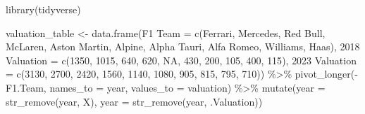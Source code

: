 \documentclass[
]{book}
\newenvironment{Shaded}{\begin{snugshade}}{\end{snugshade}}
\newcommand{\AttributeTok}[1]{\textcolor[rgb]{0.77,0.63,0.00}{#1}}
\newcommand{\ConstantTok}[1]{\textcolor[rgb]{0.00,0.00,0.00}{#1}}
\newcommand{\DecValTok}[1]{\textcolor[rgb]{0.00,0.00,0.81}{#1}}
\newcommand{\FunctionTok}[1]{\textcolor[rgb]{0.00,0.00,0.00}{#1}}
\newcommand{\NormalTok}[1]{#1}
\newcommand{\OtherTok}[1]{\textcolor[rgb]{0.56,0.35,0.01}{#1}}
\newcommand{\SpecialCharTok}[1]{\textcolor[rgb]{0.00,0.00,0.00}{#1}}
\newcommand{\StringTok}[1]{\textcolor[rgb]{0.31,0.60,0.02}{#1}}
\begin{document}
\begin{Shaded}
\begin{Highlighting}[]
\FunctionTok{library}\NormalTok{(tidyverse)}

\NormalTok{valuation\_table }\OtherTok{\textless{}{-}} \FunctionTok{data.frame}\NormalTok{(}\StringTok{\textasciigrave{}}\AttributeTok{F1 Team}\StringTok{\textasciigrave{}} \OtherTok{=} \FunctionTok{c}\NormalTok{(}\StringTok{\textquotesingle{}Ferrari\textquotesingle{}}\NormalTok{, }\StringTok{\textquotesingle{}Mercedes\textquotesingle{}}\NormalTok{, }\StringTok{\textquotesingle{}Red Bull\textquotesingle{}}\NormalTok{, }\StringTok{\textquotesingle{}McLaren\textquotesingle{}}\NormalTok{, }\StringTok{\textquotesingle{}Aston Martin\textquotesingle{}}\NormalTok{,}
                                            \StringTok{\textquotesingle{}Alpine\textquotesingle{}}\NormalTok{, }\StringTok{\textquotesingle{}Alpha Tauri\textquotesingle{}}\NormalTok{, }\StringTok{\textquotesingle{}Alfa Romeo\textquotesingle{}}\NormalTok{, }\StringTok{\textquotesingle{}Williams\textquotesingle{}}\NormalTok{, }\StringTok{\textquotesingle{}Haas\textquotesingle{}}\NormalTok{),}
                              \StringTok{\textasciigrave{}}\AttributeTok{2018 Valuation}\StringTok{\textasciigrave{}} \OtherTok{=} \FunctionTok{c}\NormalTok{(}\DecValTok{1350}\NormalTok{, }\DecValTok{1015}\NormalTok{, }\DecValTok{640}\NormalTok{, }\DecValTok{620}\NormalTok{, }\ConstantTok{NA}\NormalTok{, }\DecValTok{430}\NormalTok{, }\DecValTok{200}\NormalTok{, }\DecValTok{105}\NormalTok{, }\DecValTok{400}\NormalTok{, }\DecValTok{115}\NormalTok{),}
                              \StringTok{\textasciigrave{}}\AttributeTok{2023 Valuation}\StringTok{\textasciigrave{}} \OtherTok{=} \FunctionTok{c}\NormalTok{(}\DecValTok{3130}\NormalTok{, }\DecValTok{2700}\NormalTok{, }\DecValTok{2420}\NormalTok{, }\DecValTok{1560}\NormalTok{, }\DecValTok{1140}\NormalTok{, }\DecValTok{1080}\NormalTok{, }\DecValTok{905}\NormalTok{, }\DecValTok{815}\NormalTok{, }\DecValTok{795}\NormalTok{, }\DecValTok{710}\NormalTok{)) }\SpecialCharTok{\%\textgreater{}\%}
  \FunctionTok{pivot\_longer}\NormalTok{(}\SpecialCharTok{{-}}\NormalTok{ F1.Team, }\AttributeTok{names\_to =} \StringTok{\textquotesingle{}year\textquotesingle{}}\NormalTok{, }\AttributeTok{values\_to =} \StringTok{\textquotesingle{}valuation\textquotesingle{}}\NormalTok{) }\SpecialCharTok{\%\textgreater{}\%}
  \FunctionTok{mutate}\NormalTok{(}\AttributeTok{year =} \FunctionTok{str\_remove}\NormalTok{(year, }\StringTok{\textquotesingle{}X\textquotesingle{}}\NormalTok{),}
         \AttributeTok{year =} \FunctionTok{str\_remove}\NormalTok{(year, }\StringTok{\textquotesingle{}.Valuation\textquotesingle{}}\NormalTok{))}


\end{Highlighting}
\end{Shaded}
\end{document}
